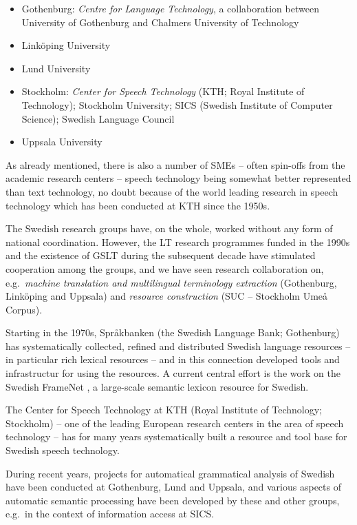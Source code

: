 \begin{multicols}{2}
\begin{itemize}
\item Gothenburg: \emph{Centre for Language Technology}, a collaboration between University of Gothenburg and Chalmers University of Technology
\item Linköping University
\item Lund University
\item Stockholm: \emph{Center for Speech Technology} (KTH; Royal
  Institute of Technology); Stockholm University; SICS (Swedish
  Institute of Computer Science); Swedish Language Council
\item Uppsala University
\end{itemize}

As already mentioned, there is also a number of SMEs -- often
spin-offs from the academic research centers -- speech technology
being somewhat better represented than text technology, no doubt
because of the world leading research in speech technology which has
been conducted at KTH since the 1950s.

The Swedish research groups have, on the whole, worked without any
form of national coordination. However, the LT research programmes
funded in the 1990s and the existence of GSLT during the subsequent
decade have stimulated cooperation among the groups, and we have seen
research collaboration on, e.g.~\emph{machine translation and
  multilingual terminology extraction} (Gothenburg, Linköping and
Uppsala) and \emph{resource construction} (SUC -- Stockholm Umeå
Corpus).

Starting in the 1970s, Språkbanken (the Swedish Language Bank;
Gothenburg) has systematically collected, refined and distributed
Swedish language resources -- in particular rich lexical resources --
and in this connection developed tools and infrastructur for using the
resources. A current central effort is the work on the Swedish
FrameNet \cite{swefn}, a large-scale semantic lexicon resource for
Swedish.

The Center for Speech Technology at KTH (Royal Institute of
Technology; Stockholm) -- one of the leading European research centers
in the area of speech technology -- has for many years systematically
built a resource and tool base for Swedish speech technology.

During recent years, projects for automatical grammatical analysis of
Swedish have been conducted at Gothenburg, Lund and Uppsala, and
various aspects of automatic semantic processing have been developed
by these and other groups, e.g.~in the context of information access
at SICS.


\end{multicols}
